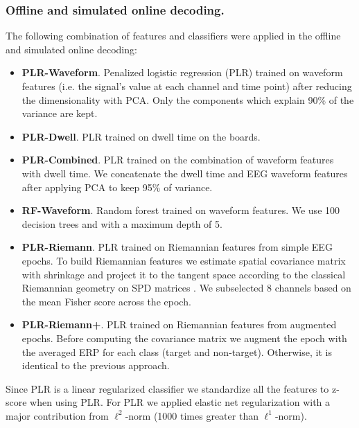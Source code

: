 \documentclass[12pt]{iopart}
\begin{document}
\subsubsection*{Offline and simulated online decoding.}
The following combination of features and classifiers were applied in the offline and simulated online decoding:
\begin{itemize}
    \item \textbf{PLR-Waveform}. Penalized logistic regression (PLR) trained on waveform features (i.e. the signal's
        value at each channel and time point) after reducing
        the dimensionality with PCA. Only the components which explain 90\% of the variance
        are kept. 
    \item \textbf{PLR-Dwell}. PLR trained on dwell time on the boards.
    \item \textbf{PLR-Combined}. PLR trained on the combination of waveform features with dwell time. We concatenate
        the dwell time and EEG waveform features after applying PCA to keep 95\% of variance. 

    \item \textbf{RF-Waveform}. Random forest trained on waveform features. We use 100 decision trees and
        with a maximum depth of 5.
    \item \textbf{PLR-Riemann}. PLR trained on Riemannian features from simple EEG epochs.
        To build Riemannian features we
        estimate spatial covariance matrix with shrinkage and project it
        to the tangent space according to the classical Riemannian geometry on SPD matrices
        \cite{barachant_multiclass_2012}.
        We subselected 8 channels based on the mean Fisher score across the epoch.
    \item \textbf{PLR-Riemann+}. PLR trained on Riemannian features from augmented epochs.
        Before computing the covariance matrix we augment the epoch with the averaged ERP
        for each class (target and non-target). Otherwise, it is identical to the previous
        approach.
\end{itemize}

Since PLR is a linear regularized classifier 
we standardize all the features to z-score when
using PLR. For PLR we applied elastic net regularization
with a major contribution from $\ell^2$-norm (1000 times greater than $\ell^1$-norm).
\end{document}
